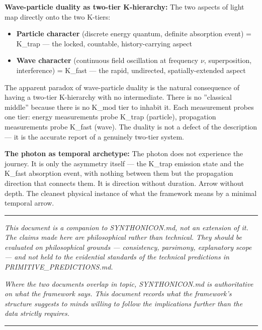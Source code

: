 \documentclass[12pt,a4paper]{article}
\begin{document}
\textbf{Wave-particle duality as two-tier K-hierarchy:} The two aspects of light map directly onto the two K-tiers:

\begin{itemize}
    \item \textbf{Particle character} (discrete energy quantum, definite absorption event) = K\_trap --- the locked, countable, history-carrying aspect
    \item \textbf{Wave character} (continuous field oscillation at frequency $\nu$, superposition, interference) = K\_fast --- the rapid, undirected, spatially-extended aspect
\end{itemize}

The apparent paradox of wave-particle duality is the natural consequence of having a two-tier K-hierarchy with no intermediate. There is no ''classical middle'' because there is no K\_mod tier to inhabit it. Each measurement probes one tier: energy measurements probe K\_trap (particle), propagation measurements probe K\_fast (wave). The duality is not a defect of the description --- it is the accurate report of a genuinely two-tier system.

\textbf{The photon as temporal archetype:} The photon does not experience the journey. It is only the asymmetry itself --- the K\_trap emission state and the K\_fast absorption event, with nothing between them but the propagation direction that connects them. It is direction without duration. Arrow without depth. The cleanest physical instance of what the framework means by a minimal temporal arrow.

\begin{center}
\rule{0.5\textwidth}{0.4pt}
\end{center}

\emph{This document is a companion to SYNTHONICON.md, not an extension of it. The claims made here are philosophical rather than technical. They should be evaluated on philosophical grounds --- consistency, parsimony, explanatory scope --- and not held to the evidential standards of the technical predictions in PRIMITIVE\_PREDICTIONS.md.}

\emph{Where the two documents overlap in topic, SYNTHONICON.md is authoritative on what the framework says. This document records what the framework's structure suggests to minds willing to follow the implications further than the data strictly requires.}

\begin{center}
\rule{0.5\textwidth}{0.4pt}
\end{center}
\end{document}
